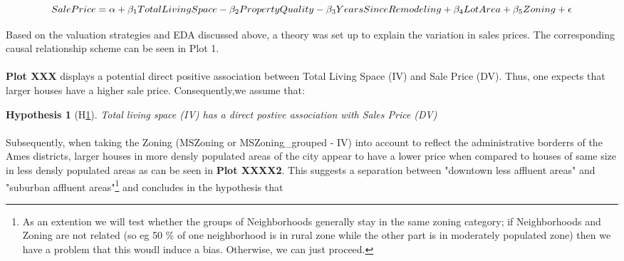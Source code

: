 \documentclass{article}
\newtheorem{hyp}{Hypothesis}
\begin{document}
$$ {SalePrice} = \alpha + \beta_{1} TotalLivingSpace - \beta_{2}  Property Quality - \beta_{3}  YearsSinceRemodeling  \linebreak
+ \beta_{4}  LotArea + \beta_{5} Zoning + \epsilon$$


\indent Based on the valuation strategies and EDA discussed above, a theory was set up to explain the variation in sales prices. The corresponding causal relationship scheme can be seen in Plot 1. 

\indent \paragraph{} \textbf{Plot XXX} displays a potential direct positive association between Total Living Space (IV) and Sale Price (DV). Thus, one expects that larger houses have a higher sale price. Consequently,we assume that:

\begin{hyp}[H\ref{hyp:first}] \label{hyp:first}
Total living space (IV) has a direct postive association with Sales Price (DV)
\end{hyp}

\begin{center}
\end{center}


\indent \paragraph{} Subsequently, when taking the Zoning (MSZoning or MSZoning\_grouped - IV) into account to reflect the administrative borderrs of the Ames districts, larger houses in more densly populated areas of the city appear to have a lower price when compared to houses of same size in less densly populated areas as can be seen in \textbf{Plot XXXX2}. This suggests a separation between "downtown less affluent areas" and "suburban affluent areas"\footnote{As an extention\: we will test whether the groups of Neighborhoods generally stay in the same zoning category; if Neighborhoods and Zoning are not related (so eg 50 \% of one neighborhood is in rural zone while the other part is in moderately populated zone) then we have a problem that this woudl induce a bias. Otherwise, we can just proceed.} and concludes in the hypothesis that
\end{document}
